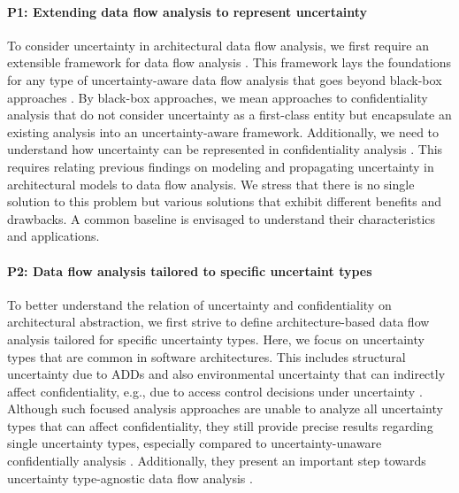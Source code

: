 \paragraph{P1: Extending data flow analysis to represent uncertainty}\label{p:3:1}
To consider uncertainty in architectural data flow analysis, we first require an extensible framework for data flow analysis \cite{boltz_extensible_2024}.
This framework lays the foundations for any type of uncertainty-aware data flow analysis that goes beyond black-box approaches \cite{walter_architectural_2022}.
By black-box approaches, we mean approaches to confidentiality analysis that do not consider uncertainty as a first-class entity but encapsulate an existing analysis into an uncertainty-aware framework.
Additionally, we need to understand how uncertainty can be represented in confidentiality analysis \cite{hahner_model-based_2023}.
This requires relating previous findings on modeling and propagating uncertainty in architectural models to data flow analysis.
We stress that there is no single solution to this problem but various solutions that exhibit different benefits and drawbacks.
A common baseline is envisaged to understand their characteristics and applications.

\paragraph{P2: Data flow analysis tailored to specific uncertaint types}\label{p:3:2}
To better understand the relation of uncertainty and confidentiality on architectural abstraction, we first strive to define architecture-based data flow analysis tailored for specific uncertainty types.
Here, we focus on uncertainty types that are common in software architectures.
This includes structural uncertainty due to \acfp{ADD} \cite{walter_architectural_2022,jansen_software_2005} and also environmental uncertainty that can indirectly affect confidentiality, e.g., due to access control decisions under uncertainty \cite{boltz_handling_2022,bures_capturing_2020}.
Although such focused analysis approaches are unable to analyze all uncertainty types that can affect confidentiality, they still provide precise results regarding single uncertainty types, especially compared to uncertainty-unaware confidentially analysis \cite{seifermann_architectural_2022}.
Additionally, they present an important step towards uncertainty type-agnostic data flow analysis \cite{hahner_model-based_2023}.

